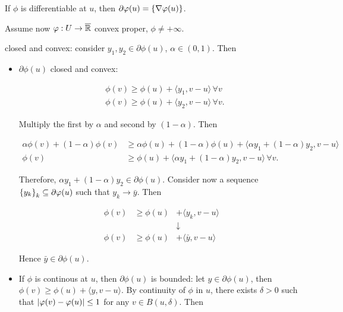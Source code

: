 \begin{remark}
    
    If $\phi$ is differentiable at $u$, then $\partial \varphi(u) = \left\{ \nabla \varphi(u) \right\}$.

\end{remark}

Assume now $\varphi : U \to \overline{\mathbb{R}}$ convex proper, $\phi \neq +\infty$. 

closed and convex: consider $y_1,y_2 \in \partial\phi(u)$, $\alpha \in (0,1)$. Then 

\begin{itemize}
    \item $\partial\phi(u)$ closed and convex: 
        
        \begin{align*}
            &\phi(v) \ge \phi(u) + \langle y_1, v-u \rangle \, \forall v \\
            &\phi(v) \ge \phi(u) + \langle y_2, v-u \rangle \, \forall v.
        \end{align*}

        Multiply the first by $\alpha$ and second by $(1-\alpha)$. Then 

        \begin{align*}
            \alpha \phi(v) + (1-\alpha) \phi(v) &\ge \alpha \phi(u) + (1-\alpha)\phi(u) + \langle \alpha y_1 + (1-\alpha)y_2, v-u \rangle \\
            \phi(v) &\ge \phi(u) + \langle \alpha y_1 + (1-\alpha)y_2, v-u\rangle \, \forall v.
        \end{align*}

        Therefore, $\alpha y_1 + (1-\alpha)y_2 \in \partial \phi(u)$. Consider now a sequence $\left\{ y_k \right\}_k \subseteq \partial \varphi(u)$ such that $y_k \to \bar{y}$. Then 

        \[
            \begin{array}{ccc}
                \phi(v) &\ge \phi(u) &+\langle y_k, v-u\rangle \\
                & & \downarrow \\
                \phi(v) &\ge \phi(u) &+\langle \bar{y}, v-u \rangle
            \end{array}
        \]

        Hence $\bar{y} \in \partial\phi(u)$.

    \item If $\phi$ is continous at $u$, then $\partial\phi(u)$ is bounded: let $y \in \partial \phi(u)$, then $\phi(v) \ge \phi(u) + \langle y, v-u \rangle$. By continuity of $\phi$ in $u$, there exists $\delta > 0$ such that $\left|\varphi(v) - \varphi(u)\right| \le 1$ for any $v \in B(u,\delta)$. Then 
            

\end{itemize}
